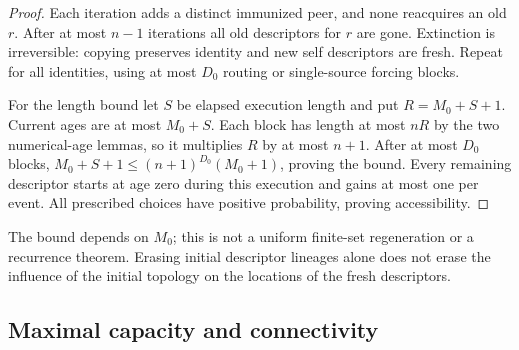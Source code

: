 \documentclass[11pt]{article}
\begin{document}
\begin{proof}
Each iteration adds a distinct immunized peer, and none
reacquires an old $r$. After at most $n-1$ iterations all old
descriptors for $r$ are gone. Extinction is irreversible:
copying preserves identity and new self descriptors are fresh.
Repeat for all identities, using at most $D_0$ routing or
single-source forcing blocks.

For the length bound let $S$ be elapsed execution length and
put $R=M_0+S+1$. Current ages are at most $M_0+S$.
Each block has length at most $nR$ by the two numerical-age
lemmas, so it multiplies $R$ by at most $n+1$.
After at most $D_0$ blocks,
$M_0+S+1\le(n+1)^{D_0}(M_0+1)$, proving the bound.
Every remaining descriptor starts at age zero during this
execution and gains at most one per event. All prescribed choices
have positive probability, proving accessibility.
\end{proof}

The bound depends on $M_0$; this is not a uniform finite-set
regeneration or a recurrence theorem. Erasing initial descriptor
lineages alone does not erase the influence of the initial topology
on the locations of the fresh descriptors.

\subsection{Maximal capacity and connectivity}
\end{document}
